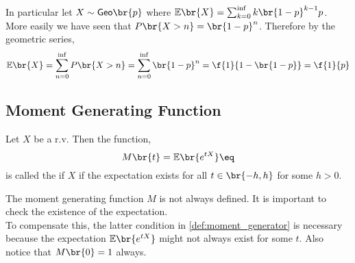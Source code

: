 \documentclass{article}
\newcommand{\Exp}{\mathbb{E}}
\newcommand{\Mom}{M}
\newcommand{\Geo}{\mathsf{Geo}}
\begin{document}
\begin{example}
    In particular let $X \sim \Geo\br{p}$ where $\Exp\br{X} = \sum_{k=0}^{\inf} k \br{1-p}^{k-1} p$. More easily we have seen that $P\br{X > n} = \br{1 - p}^n$. Therefore by the geometric series,
    \[ \Exp\br{X} = \sum_{n=0}^{\inf}P\br{X>n} = \sum_{n=0}^{\inf} \br{1-p}^n = \f{1}{1 - \br{1-p}} = \f{1}{p} \]
\end{example}

\subsection{Moment Generating Function}

\begin{definition}
    \label{def:moment_generator}
    Let $X$ be a r.v. Then the function,
    \[ \Mom\br{t} = \Exp\br{e^{tX}} \eq \label{eq:moment_generator} \]
    is called the  if $X$ if the expectation exists for all $t \in \br{-h, h}$ for some $h > 0$.
\end{definition}

\begin{remark}
    The moment generating function $\Mom$ is not always defined. It is important to check the existence of the expectation. \\
    To compensate this, the latter condition  in \cref{def:moment_generator} is necessary because the expectation $\Exp\br{e^{tX}}$ might not always exist for some $t$. Also notice that $\Mom\br{0} = 1$ always.
\end{remark}
\end{document}
